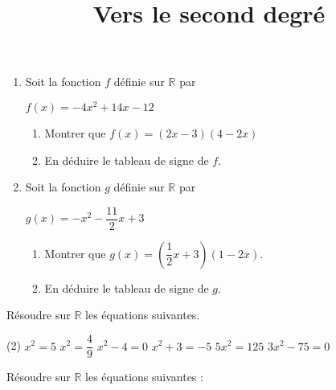 \documentclass{exercice}
\title{Vers le second degré}
\begin{document}
\maketitle


\vspace{-1cm}

\begin{multicols*}{2}
\begin{exo}
  \begin{enumerate}[nosep]
  \item Soit la fonction $f$ définie sur $\mathbb{R}$ par \\
    \centerline{$f(x) = -4x^2 + 14x - 12$}
    \begin{enumerate}
    \item Montrer que $f(x) = (2x - 3)(4 - 2x)$
    \item En déduire le tableau de signe de $f$.
    \end{enumerate}
  \item Soit la fonction $g$ définie sur $\mathbb{R}$ par \\
    \centerline{$g(x) = -x^2 - \dfrac{11}{2}x + 3$}
    \begin{enumerate}[nosep]
    \item Montrer que $g(x) = \left( \dfrac{1}{2}x + 3 \right) (1 - 2 x)$.
    \item En déduire le tableau de signe de $g$. 
    \end{enumerate}
  \end{enumerate}
\end{exo}

\begin{exo}
  Résoudre sur $\mathbb{R}$ les équations suivantes. 

  \begin{tasks}(2)
    \task $x^2 = 5$
    \task $x ^2 = \dfrac{4}{9}$
    \task $x^2 - 4 = 0$
    \task $x^2 + 3 = -5$
    \task $5x^2 = 125$
    \task $3x^2 - 75 = 0$
  \end{tasks}
\end{exo}

\begin{exo}
  Résoudre sur $\mathbb{R}$ les équations suivantes :


\end{exo}
\end{multicols*}
\end{document}
